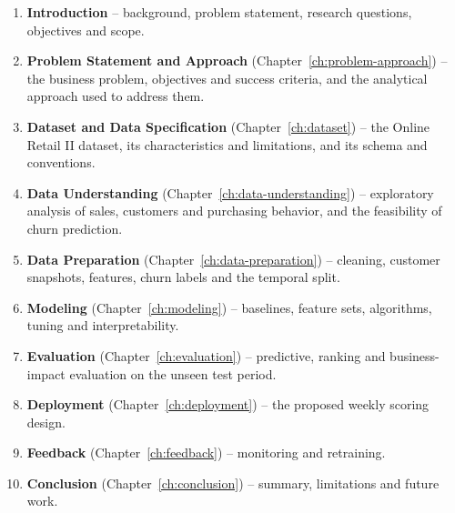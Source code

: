 \begin{enumerate}
    \item \textbf{Introduction} -- background, problem statement, research questions, objectives and scope.
    \item \textbf{Problem Statement and Approach} (Chapter~\ref{ch:problem-approach}) -- the business problem, objectives and success criteria, and the analytical approach used to address them.
    \item \textbf{Dataset and Data Specification} (Chapter~\ref{ch:dataset}) -- the Online Retail II dataset, its characteristics and limitations, and its schema and conventions.
    \item \textbf{Data Understanding} (Chapter~\ref{ch:data-understanding}) -- exploratory analysis of sales, customers and purchasing behavior, and the feasibility of churn prediction.
    \item \textbf{Data Preparation} (Chapter~\ref{ch:data-preparation}) -- cleaning, customer snapshots, features, churn labels and the temporal split.
    \item \textbf{Modeling} (Chapter~\ref{ch:modeling}) -- baselines, feature sets, algorithms, tuning and interpretability.
    \item \textbf{Evaluation} (Chapter~\ref{ch:evaluation}) -- predictive, ranking and business-impact evaluation on the unseen test period.
    \item \textbf{Deployment} (Chapter~\ref{ch:deployment}) -- the proposed weekly scoring design.
    \item \textbf{Feedback} (Chapter~\ref{ch:feedback}) -- monitoring and retraining.
    \item \textbf{Conclusion} (Chapter~\ref{ch:conclusion}) -- summary, limitations and future work.
\end{enumerate}
